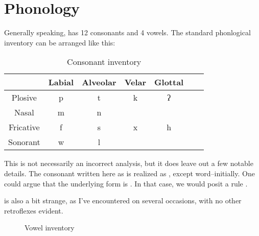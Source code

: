 \chapter{Phonology}

Generally speaking, \langname{} has 12 consonants and 4 vowels. The standard phonlogical inventory can be arranged like this:

\begin{table}[ht]


  \centering
  \begin{tabular}{*{7}{c}}
    \toprule
              & Labial & Alveolar & Velar & Glottal \\\midrule
    Plosive   & p      & t        & k     & ʔ       \\
    Nasal     & m      & n        &       &         \\
    Fricative & f      & s        & x     & h       \\
    Sonorant  & w      & l        &       &         \\
    \bottomrule
  \end{tabular}
  \caption{Consonant inventory}
\end{table}

This is not necessarily an incorrect analysis, but it does leave out a few notable details. The consonant written here as  is realized as , except word--initially. One could argue that the underlying form is . In that case, we would posit a rule .


 is also a bit strange, as I've encountered  on several occasions, with no other retroflexes evident.

\begin{figure}[htbp]
  \centering
  \begin{vowel}
  \end{vowel}
  \caption{Vowel inventory}
\end{figure}
